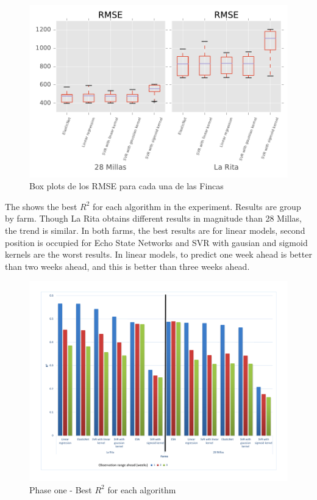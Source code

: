 \begin{figure}[H] 
 \centering
 \includegraphics[scale=.8]{Usado_2017-04-30_Sigatoka_RMSE_Boxplot}
 \caption{Box plots de los RMSE para cada una de las Fincas} 
 \label{figura4} 
\end{figure}



The  shows the best $R^2$ for each algorithm in the experiment. Results are group by farm. Though La Rita obtains different results in magnitude than 28 Millas, the trend is similar. In both farms, the best results are for linear models, second position is occupied for Echo State Networks and  SVR with gausian and sigmoid kernels are the worst results. In linear models, to predict one week ahead is better than two weeks ahead, and this is better than three weeks ahead. 

\begin{figure}[H] 
 \centering
 \includegraphics[scale=.5]{2017-01-15-Algorithms-R2}
 \caption{Phase one - Best $R^2$ for each algorithm} 
 \label{figura5} 
\end{figure}


